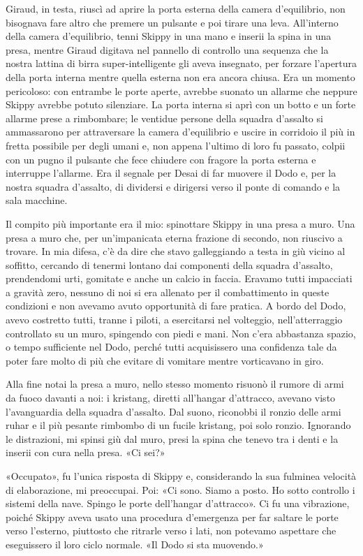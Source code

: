 Giraud, in testa, riuscì ad aprire la porta esterna della camera
d'equilibrio, non bisognava fare altro che premere un pulsante e poi
tirare una leva. All'interno della camera d'equilibrio, tenni Skippy in
una mano e inserii la spina in una presa, mentre Giraud digitava nel
pannello di controllo una sequenza che la nostra lattina di birra
super-intelligente gli aveva insegnato, per forzare l'apertura della
porta interna mentre quella esterna non era ancora chiusa. Era un
momento pericoloso: con entrambe le porte aperte, avrebbe suonato un
allarme che neppure Skippy avrebbe potuto silenziare. La porta interna
si aprì con un botto e un forte allarme prese a rimbombare; le ventidue
persone della squadra d'assalto si ammassarono per attraversare la
camera d'equilibrio e uscire in corridoio il più in fretta possibile per
degli umani e, non appena l'ultimo di loro fu passato, colpii con un
pugno il pulsante che fece chiudere con fragore la porta esterna e
interruppe l'allarme. Era il segnale per Desai di far muovere il Dodo e,
per la nostra squadra d'assalto, di dividersi e dirigersi verso il ponte
di comando e la sala macchine.

Il compito più importante era il mio: spinottare Skippy in una presa a
muro. Una presa a muro che, per un'impanicata eterna frazione di
secondo, non riuscivo a trovare. In mia difesa, c'è da dire che stavo
galleggiando a testa in giù vicino al soffitto, cercando di tenermi
lontano dai componenti della squadra d'assalto, prendendomi urti,
gomitate e anche un calcio in faccia. Eravamo tutti impacciati a gravità
zero, nessuno di noi si era allenato per il combattimento in queste
condizioni e non avevamo avuto opportunità di fare pratica. A bordo del
Dodo, avevo costretto tutti, tranne i piloti, a esercitarsi nel
volteggio, nell'atterraggio controllato su un muro, spingendo con piedi
e mani. Non c'era abbastanza spazio, o tempo sufficiente nel Dodo,
perché tutti acquisissero una confidenza tale da poter fare molto di più
che evitare di vomitare mentre vorticavano in giro.

Alla fine notai la presa a muro, nello stesso momento risuonò il rumore
di armi da fuoco davanti a noi: i kristang, diretti all'hangar
d'attracco, avevano visto l'avanguardia della squadra d'assalto. Dal
suono, riconobbi il ronzio delle armi ruhar e il più pesante rimbombo di
un fucile kristang, poi solo ronzio. Ignorando le distrazioni, mi spinsi
giù dal muro, presi la spina che tenevo tra i denti e la inserii con
cura nella presa. «Ci sei?»

«Occupato», fu l'unica risposta di Skippy e, considerando la sua
fulminea velocità di elaborazione, mi preoccupai. Poi: «Ci sono. Siamo a
posto. Ho sotto controllo i sistemi della nave. Spingo le porte
dell'hangar d'attracco». Ci fu una vibrazione, poiché Skippy aveva usato
una procedura d'emergenza per far saltare le porte verso l'esterno,
piuttosto che ritrarle verso i lati, non potevamo aspettare che
eseguissero il loro ciclo normale. «Il Dodo si sta muovendo.»

